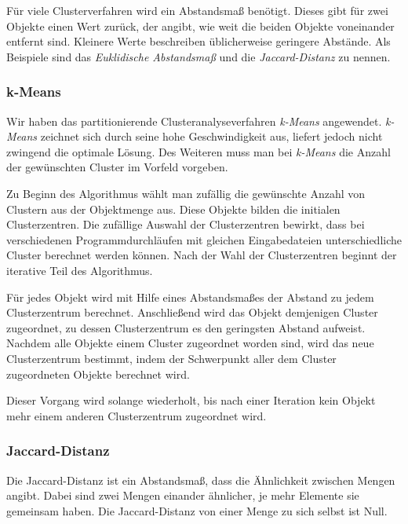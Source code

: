 \documentclass[a4paper]{llncs}
\begin{document}
Für viele Clusterverfahren wird ein Abstandsmaß benötigt. Dieses gibt für zwei Objekte einen Wert zurück, der angibt, wie weit die beiden Objekte voneinander entfernt sind. Kleinere Werte beschreiben üblicherweise geringere Abstände. 
Als Beispiele sind das \emph{Euklidische Abstandsmaß} und die \emph{Jaccard-Distanz} zu nennen.

\subsubsection{k-Means}
Wir haben das partitionierende Clusteranalyseverfahren \emph{k-Means} angewendet.
\emph{k-Means} zeichnet sich durch seine hohe Geschwindigkeit aus, liefert jedoch nicht zwingend die optimale Lösung. Des Weiteren muss man bei \emph{k-Means} die Anzahl der gewünschten Cluster im Vorfeld vorgeben.

Zu Beginn des Algorithmus wählt man zufällig die gewünschte Anzahl von Clustern aus der Objektmenge aus. Diese Objekte bilden die initialen Clusterzentren. Die zufällige Auswahl der Clusterzentren bewirkt, dass bei verschiedenen Programmdurchläufen mit gleichen Eingabedateien unterschiedliche Cluster berechnet werden können. Nach der Wahl der Clusterzentren beginnt der iterative Teil des Algorithmus.

Für jedes Objekt wird mit Hilfe eines Abstandsmaßes der Abstand zu jedem Clusterzentrum berechnet. Anschließend wird das Objekt demjenigen Cluster zugeordnet, zu dessen Clusterzentrum es den geringsten Abstand aufweist.
Nachdem alle Objekte einem Cluster zugeordnet worden sind, wird das neue Clusterzentrum bestimmt, indem der Schwerpunkt aller dem Cluster zugeordneten Objekte berechnet wird.

Dieser Vorgang wird solange wiederholt, bis nach einer Iteration kein Objekt mehr einem anderen Clusterzentrum zugeordnet wird.

\subsubsection{Jaccard-Distanz}
Die Jaccard-Distanz ist ein Abstandsmaß, dass die Ähnlichkeit zwischen Mengen angibt. Dabei sind zwei Mengen einander ähnlicher, je mehr Elemente sie gemeinsam haben. Die Jaccard-Distanz von einer Menge zu sich selbst ist Null.
\end{document}
